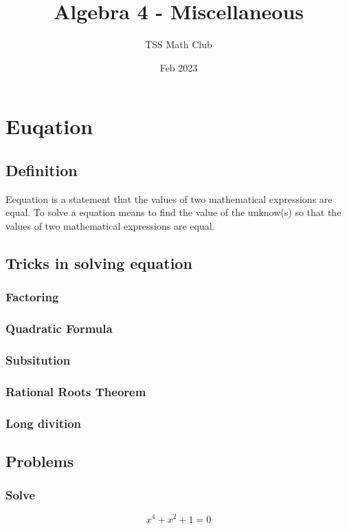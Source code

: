 \documentclass{article}
\title{Algebra 4 - Miscellaneous}
\author{TSS Math Club}
\date{Feb 2023}
\begin{document}
\large

\maketitle

\section{Euqation}

\subsection{Definition}
Eequation is a statement that the values of two mathematical expressions are equal.
To solve a equation means to find the value of the unknow(s) so that the values of two mathematical expressions are equal.

\subsection{Tricks in solving equation}

\subsubsection{Factoring}
\vspace{40px}
\subsubsection{Quadratic Formula}
\vspace{40px}
\subsubsection{Subsitution}
\vspace{40px}
\subsubsection{Rational Roots Theorem}
\vspace{40px}
\subsubsection{Long divition}
\vspace{40px}
\pagebreak
\subsection{Problems}
\subsubsection{Solve}
$$x^4+x^2+1=0$$
\vspace{40px}
\end{document}
